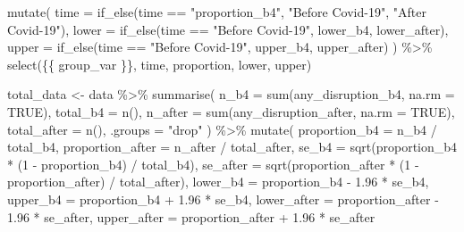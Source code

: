 \documentclass[
  letterpaper,
  DIV=11,
  numbers=noendperiod]{scrartcl}
\newenvironment{Shaded}{\begin{snugshade}}{\end{snugshade}}
\newcommand{\AttributeTok}[1]{\textcolor[rgb]{0.40,0.45,0.13}{#1}}
\newcommand{\ConstantTok}[1]{\textcolor[rgb]{0.56,0.35,0.01}{#1}}
\newcommand{\DecValTok}[1]{\textcolor[rgb]{0.68,0.00,0.00}{#1}}
\newcommand{\FloatTok}[1]{\textcolor[rgb]{0.68,0.00,0.00}{#1}}
\newcommand{\FunctionTok}[1]{\textcolor[rgb]{0.28,0.35,0.67}{#1}}
\newcommand{\NormalTok}[1]{\textcolor[rgb]{0.00,0.23,0.31}{#1}}
\newcommand{\OtherTok}[1]{\textcolor[rgb]{0.00,0.23,0.31}{#1}}
\newcommand{\SpecialCharTok}[1]{\textcolor[rgb]{0.37,0.37,0.37}{#1}}
\newcommand{\StringTok}[1]{\textcolor[rgb]{0.13,0.47,0.30}{#1}}
\begin{document}
\begin{Shaded}
\begin{Highlighting}[]
    \FunctionTok{mutate}\NormalTok{(}
      \AttributeTok{time =} \FunctionTok{if\_else}\NormalTok{(time }\SpecialCharTok{==} \StringTok{"proportion\_b4"}\NormalTok{, }\StringTok{"Before Covid{-}19"}\NormalTok{, }\StringTok{"After Covid{-}19"}\NormalTok{),}
      \AttributeTok{lower =} \FunctionTok{if\_else}\NormalTok{(time }\SpecialCharTok{==} \StringTok{"Before Covid{-}19"}\NormalTok{, lower\_b4, lower\_after),}
      \AttributeTok{upper =} \FunctionTok{if\_else}\NormalTok{(time }\SpecialCharTok{==} \StringTok{"Before Covid{-}19"}\NormalTok{, upper\_b4, upper\_after)}
\NormalTok{    ) }\SpecialCharTok{\%\textgreater{}\%}
    \FunctionTok{select}\NormalTok{(\{\{ group\_var \}\}, time, proportion, lower, upper)}
  

\NormalTok{  total\_data }\OtherTok{\textless{}{-}}\NormalTok{ data }\SpecialCharTok{\%\textgreater{}\%}
    \FunctionTok{summarise}\NormalTok{(}
      \AttributeTok{n\_b4 =} \FunctionTok{sum}\NormalTok{(any\_disruption\_b4, }\AttributeTok{na.rm =} \ConstantTok{TRUE}\NormalTok{),}
      \AttributeTok{total\_b4 =} \FunctionTok{n}\NormalTok{(),}
      \AttributeTok{n\_after =} \FunctionTok{sum}\NormalTok{(any\_disruption\_after, }\AttributeTok{na.rm =} \ConstantTok{TRUE}\NormalTok{),}
      \AttributeTok{total\_after =} \FunctionTok{n}\NormalTok{(),}
      \AttributeTok{.groups =} \StringTok{"drop"}
\NormalTok{    ) }\SpecialCharTok{\%\textgreater{}\%}
    \FunctionTok{mutate}\NormalTok{(}
      \AttributeTok{proportion\_b4 =}\NormalTok{ n\_b4 }\SpecialCharTok{/}\NormalTok{ total\_b4,}
      \AttributeTok{proportion\_after =}\NormalTok{ n\_after }\SpecialCharTok{/}\NormalTok{ total\_after,}
      \AttributeTok{se\_b4 =} \FunctionTok{sqrt}\NormalTok{(proportion\_b4 }\SpecialCharTok{*}\NormalTok{ (}\DecValTok{1} \SpecialCharTok{{-}}\NormalTok{ proportion\_b4) }\SpecialCharTok{/}\NormalTok{ total\_b4),}
      \AttributeTok{se\_after =} \FunctionTok{sqrt}\NormalTok{(proportion\_after }\SpecialCharTok{*}\NormalTok{ (}\DecValTok{1} \SpecialCharTok{{-}}\NormalTok{ proportion\_after) }\SpecialCharTok{/}\NormalTok{ total\_after),}
      \AttributeTok{lower\_b4 =}\NormalTok{ proportion\_b4 }\SpecialCharTok{{-}} \FloatTok{1.96} \SpecialCharTok{*}\NormalTok{ se\_b4,}
      \AttributeTok{upper\_b4 =}\NormalTok{ proportion\_b4 }\SpecialCharTok{+} \FloatTok{1.96} \SpecialCharTok{*}\NormalTok{ se\_b4,}
      \AttributeTok{lower\_after =}\NormalTok{ proportion\_after }\SpecialCharTok{{-}} \FloatTok{1.96} \SpecialCharTok{*}\NormalTok{ se\_after,}
      \AttributeTok{upper\_after =}\NormalTok{ proportion\_after }\SpecialCharTok{+} \FloatTok{1.96} \SpecialCharTok{*}\NormalTok{ se\_after}

\end{Highlighting}
\end{Shaded}
\end{document}
